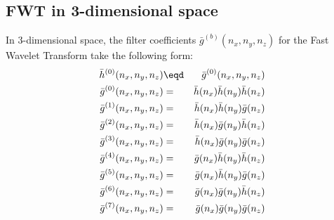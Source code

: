 \subsection {FWT in 3-dimensional space}
In 3-dimensional space, the filter coefficients $\bar{g}^{(b)}(n_x,n_y,n_z)$
for the Fast Wavelet Transform take the following form:
   \begin{eqnarray*}
      \bar{h}^{(0)}(n_x,n_y,n_z) &\eqd& \bar{g}^{(0)}(n_x,n_y,n_z) \\ 
      \bar{g}^{(0)}(n_x,n_y,n_z) &=& \bar{h}(n_x) \bar{h}(n_y) \bar{h}(n_z) \\ 
      \bar{g}^{(1)}(n_x,n_y,n_z) &=& \bar{h}(n_x) \bar{h}(n_y) \bar{g}   (n_z) \\ 
      \bar{g}^{(2)}(n_x,n_y,n_z) &=& \bar{h}(n_x) \bar{g}   (n_y) \bar{h}(n_z) \\ 
      \bar{g}^{(3)}(n_x,n_y,n_z) &=& \bar{h}(n_x) \bar{g}   (n_y) \bar{g}   (n_z) \\ 
      \bar{g}^{(4)}(n_x,n_y,n_z) &=& \bar{g}   (n_x) \bar{h}(n_y) \bar{h}(n_z) \\ 
      \bar{g}^{(5)}(n_x,n_y,n_z) &=& \bar{g}   (n_x) \bar{h}(n_y) \bar{g}   (n_z) \\ 
      \bar{g}^{(6)}(n_x,n_y,n_z) &=& \bar{g}   (n_x) \bar{g}   (n_y) \bar{h}(n_z) \\ 
      \bar{g}^{(7)}(n_x,n_y,n_z) &=& \bar{g}   (n_x) \bar{g}   (n_y) \bar{g}   (n_z)
   \end{eqnarray*}

